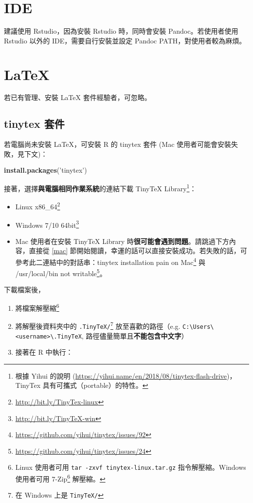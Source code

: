 \documentclass[oneside]{book}
\newenvironment{Shaded}{\begin{snugshade}}{\end{snugshade}}
\newcommand{\KeywordTok}[1]{\textcolor[rgb]{0.13,0.29,0.53}{\textbf{#1}}}
\newcommand{\NormalTok}[1]{#1}
\newcommand{\StringTok}[1]{\textcolor[rgb]{0.31,0.60,0.02}{#1}}
\renewcommand{\href}[2]{#2\footnote{\url{#1}}}
\providecommand{\tightlist}{%
  \setlength{\itemsep}{0pt}\setlength{\parskip}{0pt}}
\theoremstyle{definition}
\theoremstyle{definition}
\theoremstyle{definition}
\theoremstyle{remark}
\begin{document}
\hypertarget{ide}{%
\section{IDE}\label{ide}}

建議使用 Rstudio，因為安裝 Rstudio 時，同時會安裝 Pandoc。若使用者使用 Rstudio 以外的 IDE，需要自行安裝並設定 Pandoc PATH，對使用者較為麻煩。

\hypertarget{latex}{%
\section{LaTeX}\label{latex}}

若已有管理、安裝 LaTeX 套件經驗者，可忽略。

\hypertarget{tinytex-ux5957ux4ef6}{%
\subsection{tinytex 套件}\label{tinytex-ux5957ux4ef6}}

若電腦尚未安裝 LaTeX，可安裝 R 的 tinytex 套件 (Mac 使用者可能會安裝失敗，見下文)：

\begin{Shaded}
\begin{Highlighting}[]
\KeywordTok{install.packages}\NormalTok{(}\StringTok{'tinytex'}\NormalTok{)}
\end{Highlighting}
\end{Shaded}

接著，選擇\textbf{與電腦相同作業系統}的連結下載 TinyTeX Library\footnote{根據 Yihui 的說明 (\url{https://yihui.name/en/2018/08/tinytex-flash-drive})，TinyTex 具有可攜式（portable）的特性。}：

\begin{itemize}
\tightlist
\item
  \href{http://bit.ly/TinyTex-linux}{Linux x86\_64}
\item
  \href{http://bit.ly/TinyTeX-win}{Windows 7/10 64bit}
\item
  Mac 使用者在安裝 TinyTeX Library 時\textbf{很可能會遇到問題}。請跳過下方內容，直接從 \ref{mac} 節開始閱讀，幸運的話可以直接安裝成功。若失敗的話，可參考此二連結中的對話串：\href{https://github.com/yihui/tinytex/issues/92}{tinytex installation pain on Mac} 與 \href{https://github.com/yihui/tinytex/issues/24}{/usr/local/bin not writable}。
\end{itemize}

下載檔案後，

\begin{enumerate}
\def\labelenumi{\alph{enumi})}
\item
  將檔案解壓縮\footnote{Linux 使用者可用 \texttt{tar\ -zxvf\ tinytex-linux.tar.gz} 指令解壓縮。Windows 使用者可用 \href{https://www.developershome.com/7-zip/}{7-Zip} 解壓縮。}
\item
  將解壓後資料夾中的 \texttt{.TinyTeX/}\footnote{在 Windows 上是 \texttt{TinyTeX/}} 放至喜歡的路徑（e.g. \texttt{C:\textbackslash{}Users\textbackslash{}\textless{}username\textgreater{}\textbackslash{}.TinyTeX}, 路徑儘量簡單且\textbf{不能包含中文字}）
\item
  接著在 R 中執行：
\end{enumerate}
\end{document}
